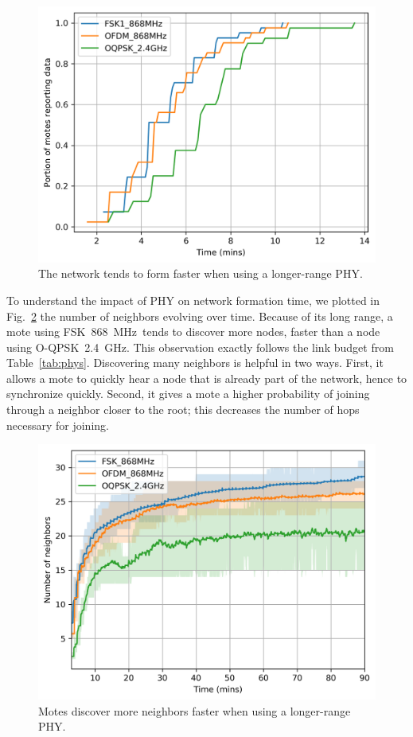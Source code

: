\documentclass[sensors,article,submit,moreauthors,pdftex]{Definitions/mdpi}
\newcommand{\fsk}           {FSK~868~MHz}
\newcommand{\oqpsk}         {O-QPSK~2.4~GHz}
\newcommand{\figwidth}      {0.78}
\begin{document}
\begin{figure}
	\centering
	\includegraphics[width=\figwidth\columnwidth]{time_firstpacket_cdf}
	\caption{The network tends to form faster when using a longer-range PHY.}
    \label{fig:time_firstpacket_cdf}
\end{figure}


To understand the impact of PHY on network formation time, we plotted in Fig.~\ref{fig:neighbors_time} the number of neighbors evolving over time.
Because of its long range, a mote using \fsk\ tends to discover more nodes, faster than a node using \oqpsk.
This observation exactly follows the link budget from Table~\ref{tab:phys}.
Discovering many neighbors is helpful in two ways.
First, it allows a mote to quickly hear a node that is already part of the network,
    hence to synchronize quickly.
Second, it gives a mote a higher probability of joining through a neighbor closer to the root; this decreases the number of hops necessary for joining.

\begin{figure}
	\centering
	\includegraphics[width=\figwidth\columnwidth]{neighbors_time}
    \caption{Motes discover more neighbors faster when using a longer-range PHY.}
    \label{fig:neighbors_time}
\end{figure}
\end{document}
